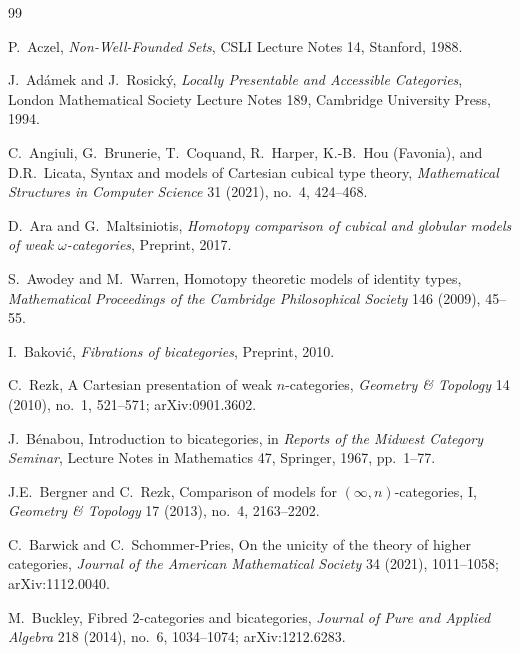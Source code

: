 \documentclass[11pt]{article}
\theoremstyle{plain}
\theoremstyle{definition}
\begin{document}
\begin{thebibliography}{99}

P.~Aczel,
\newblock \emph{Non-Well-Founded Sets},
\newblock CSLI Lecture Notes 14, Stanford, 1988.

J.~Ad\'amek and J.~Rosick\'y,
\newblock \emph{Locally Presentable and Accessible Categories},
\newblock London Mathematical Society Lecture Notes 189, Cambridge University Press, 1994.

C.~Angiuli, G.~Brunerie, T.~Coquand, R.~Harper, K.-B.~Hou (Favonia), and D.R.~Licata,
\newblock Syntax and models of Cartesian cubical type theory,
\newblock \emph{Mathematical Structures in Computer Science} 31 (2021), no.~4, 424--468.

D.~Ara and G.~Maltsiniotis,
\newblock \emph{Homotopy comparison of cubical and globular models of weak $\omega$-categories},
\newblock Preprint, 2017.

S.~Awodey and M.~Warren,
\newblock Homotopy theoretic models of identity types,
\newblock \emph{Mathematical Proceedings of the Cambridge Philosophical Society} 146 (2009), 45--55.

I.~Bakovi\'c,
\newblock \emph{Fibrations of bicategories},
\newblock Preprint, 2010.

C.~Rezk,
\newblock A Cartesian presentation of weak $n$-categories,
\newblock \emph{Geometry \& Topology} 14 (2010), no.~1, 521--571; arXiv:0901.3602.

J.~B\'enabou,
\newblock Introduction to bicategories,
\newblock in \emph{Reports of the Midwest Category Seminar}, Lecture Notes in Mathematics 47, Springer, 1967, pp.~1--77.

J.E.~Bergner and C.~Rezk,
\newblock Comparison of models for $(\infty, n)$-categories, I,
\newblock \emph{Geometry \& Topology} 17 (2013), no.~4, 2163--2202.

C.~Barwick and C.~Schommer-Pries,
\newblock On the unicity of the theory of higher categories,
\newblock \emph{Journal of the American Mathematical Society} 34 (2021), 1011--1058; arXiv:1112.0040.

M.~Buckley,
\newblock Fibred $2$-categories and bicategories,
\newblock \emph{Journal of Pure and Applied Algebra} 218 (2014), no.~6, 1034--1074; arXiv:1212.6283.


\end{thebibliography}
\end{document}
